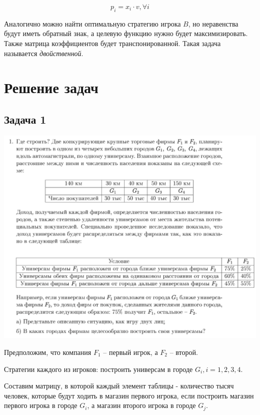 \documentclass[9pt, a4paper]{article}
\begin{document}
    \begin{equation}
        p_i = x_i\cdot v, \forall i\label{eq:equation8}
    \end{equation}

    Аналогично можно найти оптимальную стратегию игрока $B$, но
    неравенства будут иметь обратный знак, а целевую функцию нужно
    будет максимизировать.
    Также матрица коэффициентов будет транспонированной.
    Такая задача называется \textit{двойственной}.

    \newpage


    \section{Решение задач}\label{sec:solve}

    \subsection{Задача 1}\label{subsec:task1}

    \includegraphics[width=1\textwidth]{docs/1}

    Предположим, что компания $F_1$ -- первый игрок, а $F_2$ -- второй.

    Стратегии каждого из игроков: построить универсам в городе $G_i, i = 1, 2, 3, 4$.

    Составим матрицу, в которой каждый элемент таблицы - количество тысяч человек,
    которые будут ходить в магазин первого игрока,
    если построить магазин первого игрока в городе $G_i$,
    а магазин второго игрока в городе $G_j$.
\end{document}
